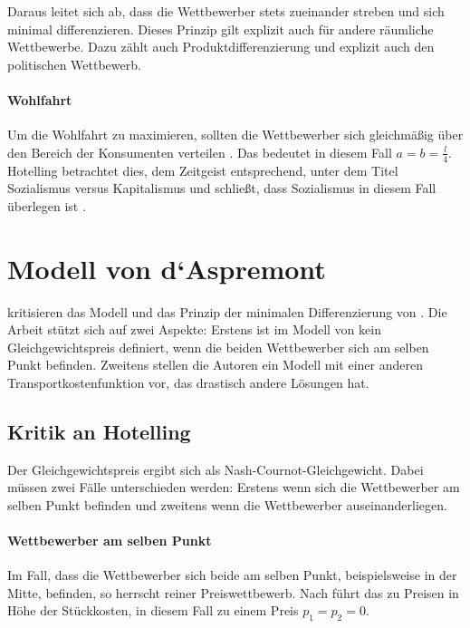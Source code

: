 Daraus leitet sich ab, dass die Wettbewerber stets zueinander streben und sich minimal differenzieren.
Dieses Prinzip gilt explizit auch für andere räumliche Wettbewerbe.
Dazu zählt \citet{hotelling1929} auch Produktdifferenzierung und explizit auch den politischen Wettbewerb. \citep[S.\,54-55]{hotelling1929}

\paragraph{Wohlfahrt}
Um die Wohlfahrt zu maximieren, sollten die Wettbewerber sich gleichmäßig über den Bereich der Konsumenten verteilen \citep[S.\,53]{hotelling1929}.
Das bedeutet in diesem Fall $a=b=\frac{l}{4}$. Hotelling betrachtet dies, dem Zeitgeist entsprechend, unter dem Titel Sozialismus versus Kapitalismus und schließt, dass Sozialismus in diesem Fall überlegen ist \citep[S.\,52]{hotelling1929}.

\section{Modell von d‘Aspremont}\label{Sec-Aspremont}

\citet{aspremont1979} kritisieren das Modell und das Prinzip der minimalen Differenzierung von \citet{hotelling1929}.
Die Arbeit stützt sich auf zwei Aspekte: Erstens ist im Modell von \citet{hotelling1929} kein Gleichgewichtspreis definiert, wenn die beiden Wettbewerber sich am selben Punkt befinden.
Zweitens stellen die Autoren ein Modell mit einer anderen Transportkostenfunktion vor, das drastisch andere Lösungen hat. \citep[S.\,1145]{aspremont1979}

\subsection{Kritik an Hotelling}
Der Gleichgewichtspreis ergibt sich als Nash-Cournot-Gleichgewicht.
Dabei müssen zwei Fälle unterschieden werden: Erstens wenn sich die Wettbewerber am selben Punkt befinden und zweitens wenn die Wettbewerber auseinanderliegen.

\paragraph{Wettbewerber am selben Punkt}
Im Fall, dass die Wettbewerber sich beide am selben Punkt, beispielsweise in der Mitte, befinden, so herrscht reiner Preiswettbewerb.
Nach \citet{bertrand1883theorie} führt das zu Preisen in Höhe der Stückkosten, in diesem Fall zu einem Preis $p_1=p_2=0$. \citep[S.\,1146-1147]{aspremont1979}

